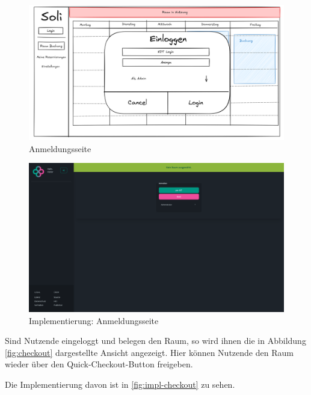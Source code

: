 \begin{figure}[ht]
    \centering
    \includegraphics[width=\textwidth]{figures/mockup/auth_login}
    \caption{Anmeldungsseite}
    \label{fig:login}
\end{figure}
\clearpage

\begin{figure}[ht]
    \centering
    \includegraphics[width=\textwidth]{figures/impl-views/auth_login}
    \caption{Implementierung: Anmeldungsseite}
    \label{fig:impl-login}
\end{figure}
\clearpage

Sind Nutzende eingeloggt und belegen den Raum,
so wird ihnen die in Abbildung \ref{fig:checkout} dargestellte Ansicht angezeigt.
Hier können Nutzende den Raum wieder über den Quick-Checkout-Button freigeben.

Die Implementierung davon ist in \ref{fig:impl-checkout} zu sehen.


